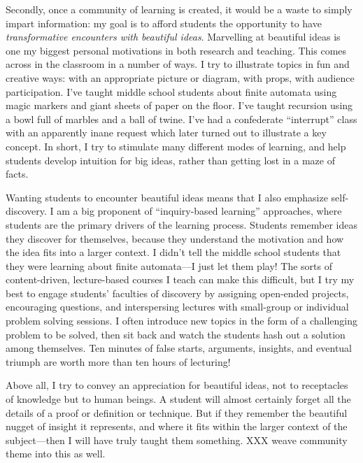 \documentclass{article}
\begin{document}
Secondly, once a community of learning is created, it would be a waste
to simply impart information: my goal is to afford students the
opportunity to have \emph{transformative encounters with beautiful
  ideas}.  Marvelling at beautiful ideas is one my biggest personal
motivations in both research and teaching.  This comes across in the
classroom in a number of ways.  I try to illustrate topics in fun and
creative ways: with an appropriate picture or diagram, with props,
with audience participation.  I've taught middle school students about
finite automata using magic markers and giant sheets of paper on the
floor.  I've taught recursion using a bowl full of marbles and a ball
of twine.  I've had a confederate ``interrupt'' class with an
apparently inane request which later turned out to illustrate a key
concept.  In short, I try to stimulate many different modes of
learning, and help students develop intuition for big ideas, rather
than getting lost in a maze of facts.

Wanting students to encounter beautiful ideas means that I also
emphasize self-discovery. I am a big proponent of ``inquiry-based
learning'' approaches, where students are the primary drivers of the
learning process. Students remember ideas they discover for
themselves, because they understand the motivation and how the idea
fits into a larger context. I didn't tell the middle school students
that they were learning about finite automata---I just let them play!
The sorts of content-driven, lecture-based courses I teach can make
this difficult, but I try my best to engage students' faculties of
discovery by assigning open-ended projects, encouraging questions, and
interspersing lectures with small-group or individual problem solving
sessions.  I often introduce new topics in the form of a challenging
problem to be solved, then sit back and watch the students hash out a
solution among themselves.  Ten minutes of false starts, arguments,
insights, and eventual triumph are worth more than ten hours of
lecturing!

Above all, I try to convey an appreciation for beautiful ideas,
not to receptacles of knowledge but to human beings. A student will
almost certainly forget all the details of a proof or definition or
technique.  But if they remember the beautiful nugget of insight it
represents, and where it fits within the larger context of the
subject---then I will have truly taught them something.
XXX weave community theme into this as well.
\end{document}
